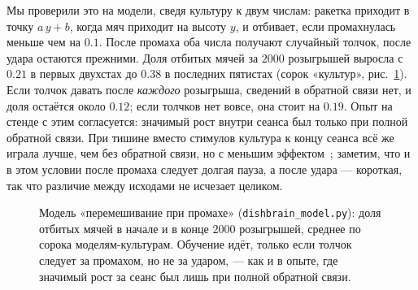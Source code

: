 Мы проверили это на модели, сведя культуру к двум числам: ракетка приходит в точку $a\,y+b$, когда мяч приходит на высоту $y$, и отбивает, если промахнулась меньше чем на $0.1$. После промаха оба числа получают случайный толчок, после удара остаются прежними. Доля отбитых мячей за $2000$ розыгрышей выросла с $0.21$ в первых двухстах до $0.38$ в последних пятистах (сорок «культур», рис.~\ref{fig:dishmodel}). Если толчок давать после \emph{каждого} розыгрыша, сведений в обратной связи нет, и доля остаётся около $0.12$; если толчков нет вовсе, она стоит на $0.19$. Опыт на стенде с этим согласуется: значимый рост внутри сеанса был только при полной обратной связи. При тишине вместо стимулов культура к концу сеанса всё же играла лучше, чем без обратной связи, но с меньшим эффектом~\cite{Kagan2022}; заметим, что и в этом условии после промаха следует долгая пауза, а после удара --- короткая, так что различие между исходами не исчезает целиком.

\begin{figure}[t]
\centering
{}
\caption{Модель «перемешивание при промахе» (\texttt{dishbrain\_model.py}): доля отбитых мячей в начале и в конце $2000$ розыгрышей, среднее по сорока моделям-культурам. Обучение идёт, только если толчок следует за промахом, но не за ударом, --- как и в опыте, где значимый рост за сеанс был лишь при полной обратной связи.}
\label{fig:dishmodel}
\end{figure}


